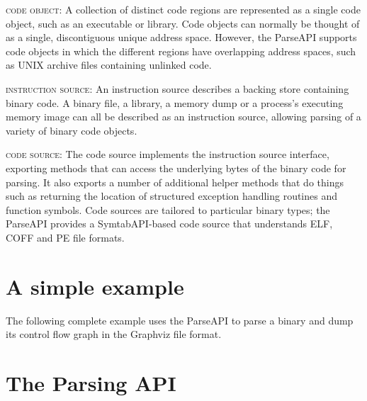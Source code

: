 \documentclass{article}
\begin{document}
%
\begin{itemize}[leftmargin=0pt,label=$\circ$]

{\item {\scshape code object}: A collection of distinct code regions are represented as a single code object, such as an executable or library. Code objects can normally be thought of as a single, discontiguous unique address space. However, the ParseAPI supports code objects in which the different regions have overlapping address spaces, such as UNIX archive files containing unlinked code.
}%

{\item {\scshape instruction source}: An instruction source describes a backing store containing binary code. A binary file, a library, a memory dump or a process's executing memory image can all be described as an instruction source, allowing parsing of a variety of binary code objects.
}%

{\item {\scshape code source}: The code source implements the instruction source interface, exporting methods that can access the underlying bytes of the binary code for parsing. It also exports a number of additional helper methods that do things such as returning the location of structured exception handling routines and function symbols. Code sources are tailored to particular binary types; the ParseAPI provides a SymtabAPI-based code source that understands ELF, COFF and PE file formats.
}%

\end{itemize}

\section{A simple example}
\label{sec:example}

The following complete example uses the ParseAPI to parse a binary and dump its control flow graph in the Graphviz file format.

\lstset{numbers=left, numberstyle=\tiny, stepnumber=5, numbersep=5pt}
\lstset{showstringspaces=false}


\section{The Parsing API}
\label{sec:api}
\end{document}
